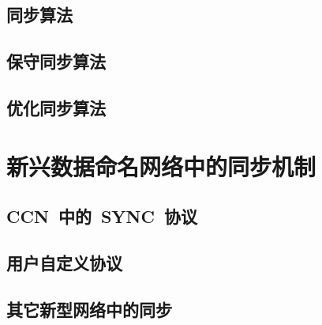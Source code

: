 \subsection{同步算法}

\subsection{保守同步算法}

\subsection{优化同步算法}



\section{新兴数据命名网络中的同步机制}
\label{innovative}

\subsection{CCN~中的~SYNC~协议}

\subsection{用户自定义协议}

\subsection{其它新型网络中的同步}

